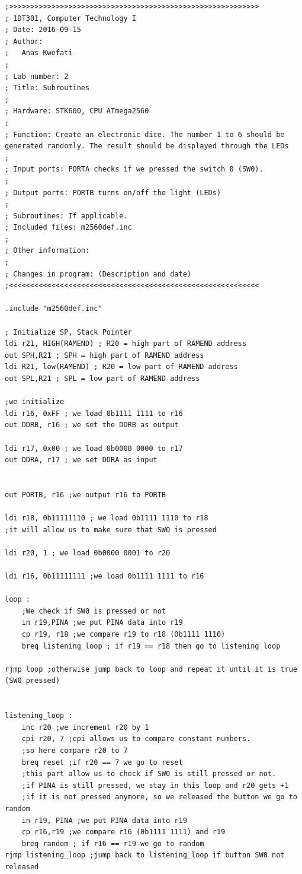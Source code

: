 \documentclass[a4paper,12pt]{article}
\begin{document}
\begin{lstlisting}
;>>>>>>>>>>>>>>>>>>>>>>>>>>>>>>>>>>>>>>>>>>>>>>>>>>>>>>>>>>>
; 1DT301, Computer Technology I
; Date: 2016-09-15
; Author:
;	Anas Kwefati
;
; Lab number: 2
; Title: Subroutines
;
; Hardware: STK600, CPU ATmega2560
;
; Function: Create an electronic dice. The number 1 to 6 should be generated randomly. The result should be displayed through the LEDs
;
; Input ports: PORTA checks if we pressed the switch 0 (SW0).
;
; Output ports: PORTB turns on/off the light (LEDs)
;
; Subroutines: If applicable.
; Included files: m2560def.inc
;
; Other information:
;
; Changes in program: (Description and date)
;<<<<<<<<<<<<<<<<<<<<<<<<<<<<<<<<<<<<<<<<<<<<<<<<<<<<<<<<<<<

.include "m2560def.inc"

; Initialize SP, Stack Pointer
ldi r21, HIGH(RAMEND) ; R20 = high part of RAMEND address
out SPH,R21 ; SPH = high part of RAMEND address
ldi R21, low(RAMEND) ; R20 = low part of RAMEND address
out SPL,R21 ; SPL = low part of RAMEND address

;we initialize
ldi r16, 0xFF ; we load 0b1111 1111 to r16
out DDRB, r16 ; we set the DDRB as output

ldi r17, 0x00 ; we load 0b0000 0000 to r17
out DDRA, r17 ; we set DDRA as input


out PORTB, r16 ;we output r16 to PORTB

ldi r18, 0b11111110 ; we load 0b1111 1110 to r18
;it will allow us to make sure that SW0 is pressed

ldi r20, 1 ; we load 0b0000 0001 to r20

ldi r16, 0b11111111 ;we load 0b1111 1111 to r16

loop :
	;We check if SW0 is pressed or not
	in r19,PINA ;we put PINA data into r19
	cp r19, r18 ;we compare r19 to r18 (0b1111 1110)
	breq listening_loop ; if r19 == r18 then go to listening_loop

rjmp loop ;otherwise jump back to loop and repeat it until it is true (SW0 pressed)


listening_loop :
	inc r20 ;we increment r20 by 1
	cpi r20, 7 ;cpi allows us to compare constant numbers.
	;so here compare r20 to 7
	breq reset ;if r20 == 7 we go to reset
	;this part allow us to check if SW0 is still pressed or not.
	;if PINA is still pressed, we stay in this loop and r20 gets +1
	;if it is not pressed anymore, so we released the button we go to random
	in r19, PINA ;we put PINA data into r19
	cp r16,r19 ;we compare r16 (0b1111 1111) and r19
	breq random ; if r16 == r19 we go to random
rjmp listening_loop ;jump back to listening_loop if button SW0 not released


\end{lstlisting}
\end{document}
